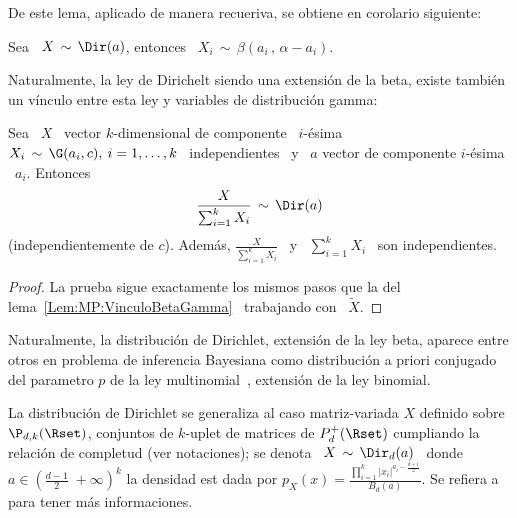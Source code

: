 De este lema, aplicado de manera recueriva, se obtiene en corolario siguiente:
%
\begin{corolario}
\label{Cor:MP:MarginalDirichletBeta}
%
  Sea  \ $X  \,  \sim \,  \Dir(a)$, entonces  \  $\displaystyle X_i  \, \sim  \,
  \beta\left( a_i \, , \, \alpha-a_i \right)$.
\end{corolario}

Naturalmente,  la ley de  Dirichelt siendo  una extensi\'on  de la  beta, existe
tambi\'en un v\'inculo entre esta ley y variables de distribuci\'on gamma:
%
\begin{lema}
\label{Lem:MP:VinculoDirichletGamma}
%
Sea \ $X$ \ vector $k$-dimensional de componente \ $i$-\'esima \ $X_i \, \sim \,
\G(a_i,c), \: i = 1, \ldots , k$ \ independientes \ y \ $a$ vector de componente
$i$-\'esima \ $a_i$. Entonces
  \[
  \frac{X}{\sum_{i=1}^k X_i} \, \sim \, \Dir(a)
  \]
  (independientemente  de $c$).   Adem\'as, $\frac{X}{\sum_{i=1}^k  X_i}$ \  y \
  $\sum_{i=1}^k X_i$ \ son independientes.
\end{lema}
%
\begin{proof}
  La    prueba   sigue    exactamente   los    mismos   pasos    que    la   del
  lema~\ref{Lem:MP:VinculoBetaGamma} \ trabajando con \ $\widetilde{X}$.
\end{proof}

Naturalmente,  la  distribuci\'on de  Dirichlet,  extensi\'on  de  la ley  beta,
aparece entre  otros en problema  de inferencia Bayesiana como  distribuci\'on a
priori  conjugado~\footref{Foot:MP:BayesPrior}  del  parametro  $p$  de  la  ley
multinomial~\cite{Rob07}, extensi\'on de la ley binomial.



La distribuci\'on de Dirichlet se generaliza al caso matriz-variada $X$ definido
sobre $\P_{d,k}(\Rset)$,  conjuntos de  $k$-uplet de matrices  de $P_d^+(\Rset)$
cumpliando la relaci\'on  de completud (ver notaciones); se denota  \ $X \, \sim
\, \Dir_d(a)$  \ donde \  $a \in \left(  \frac{d-1}{2} \; +\infty  \right)^k$ la
densidad  est dada por  $\displaystyle p_X(x)  = \frac{\prod_{i=1}^k  \left| x_i
  \right|^{a_i-\frac{d+1}{2}}}{B_d(a)}$.   Se  refiera a~\cite[Cap.~6]{GupNag99}
para tener m\'as informaciones.